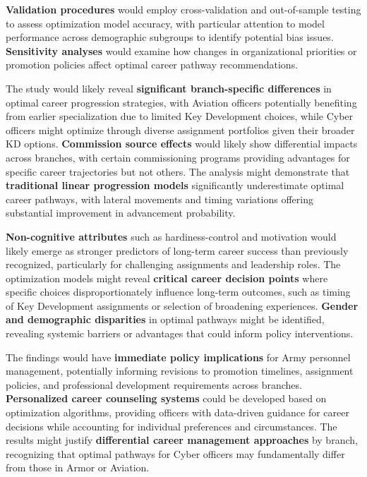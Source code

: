 \documentclass[main.tex]{subfiles}
\begin{document}
\textbf{Validation procedures} would employ cross-validation and out-of-sample testing to assess optimization model accuracy, with particular attention to model performance across demographic subgroups to identify potential bias issues\parencite{career_optimization}. \textbf{Sensitivity analyses} would examine how changes in organizational priorities or promotion policies affect optimal career pathway recommendations\parencite{succession_pipelines}.


The study would likely reveal \textbf{significant branch-specific differences} in optimal career progression strategies, with Aviation officers potentially benefiting from earlier specialization due to limited Key Development choices, while Cyber officers might optimize through diverse assignment portfolios given their broader KD options\parencite{army_indicators}. \textbf{Commission source effects} would likely show differential impacts across branches, with certain commissioning programs providing advantages for specific career trajectories but not others\parencite{army_indicators}. The analysis might demonstrate that \textbf{traditional linear progression models} significantly underestimate optimal career pathways, with lateral movements and timing variations offering substantial improvement in advancement probability\parencite{career_optimization}.

\textbf{Non-cognitive attributes} such as hardiness-control and motivation would likely emerge as stronger predictors of long-term career success than previously recognized, particularly for challenging assignments and leadership roles\parencite{army_indicators}. The optimization models might reveal \textbf{critical career decision points} where specific choices disproportionately influence long-term outcomes, such as timing of Key Development assignments or selection of broadening experiences\parencite{army_indicators}. \textbf{Gender and demographic disparities} in optimal pathways might be identified, revealing systemic barriers or advantages that could inform policy interventions\parencite{career_optimization}.


The findings would have \textbf{immediate policy implications} for Army personnel management, potentially informing revisions to promotion timelines, assignment policies, and professional development requirements across branches\parencite{succession_pipelines}. \textbf{Personalized career counseling systems} could be developed based on optimization algorithms, providing officers with data-driven guidance for career decisions while accounting for individual preferences and circumstances\parencite{career_optimization,jobcomposer}. The results might justify \textbf{differential career management approaches} by branch, recognizing that optimal pathways for Cyber officers may fundamentally differ from those in Armor or Aviation\parencite{army_indicators}.
\end{document}
